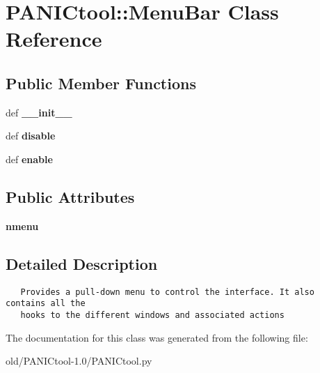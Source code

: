 \section{PANICtool::Menu\-Bar Class Reference}
\label{classPANICtool_1_1MenuBar}
\subsection*{Public Member Functions}
\begin{CompactItemize}
\item 
def \textbf{\_\-\_\-init\_\-\_\-}\label{classPANICtool_1_1MenuBar_e6f529f03896b350837da6047d225192}

\item 
def \textbf{disable}\label{classPANICtool_1_1MenuBar_10674fcf6664dcd26bf03c80a08fb4f7}

\item 
def \textbf{enable}\label{classPANICtool_1_1MenuBar_e9b03ddcdaed9ab8651e9ff19dd7166d}

\end{CompactItemize}
\subsection*{Public Attributes}
\begin{CompactItemize}
\item 
\textbf{nmenu}\label{classPANICtool_1_1MenuBar_72c8fae9ec666fe780b9edd034346748}

\end{CompactItemize}


\subsection{Detailed Description}


\footnotesize\begin{verbatim}
   Provides a pull-down menu to control the interface. It also contains all the
   hooks to the different windows and associated actions
\end{verbatim}
\normalsize
 



The documentation for this class was generated from the following file:\begin{CompactItemize}
\item 
old/PANICtool-1.0/PANICtool.py\end{CompactItemize}
